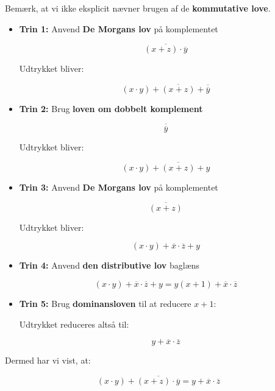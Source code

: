 \begin{solution}

    Bemærk, at vi ikke eksplicit nævner brugen af de \textbf{kommutative love}.

    \begin{itemize}

        \item \textbf{Trin 1:} Anvend \textbf{De Morgans lov} på komplementet
        
        \[ \overline{(x + z) \cdot \overline{y}} \]
        
        Udtrykket bliver:
        
        \[
        (x \cdot y) + \overline{(x + z)} + \overline{\overline{y}}
        \]
        
        \item \textbf{Trin 2:} Brug \textbf{loven om dobbelt komplement}
        
        \[
        \overline{\overline{y}}
        \]
        
        Udtrykket bliver:

         \[
        (x \cdot y) + \overline{(x + z)} + y
        \]
        
        \item \textbf{Trin 3:} Anvend \textbf{De Morgans lov} på komplementet
             
        \[
        \overline{(x + z)}
        \]
        
        Udtrykket bliver:

        \[
       (x \cdot y) + \overline{x} \cdot \overline{z} + y
       \]
        
        \item \textbf{Trin 4:} Anvend \textbf{den distributive lov} baglæns
        
        \[
        (x \cdot y) + \overline{x} \cdot \overline{z} + y = y (x + 1) + \overline{x} \cdot \overline{z}
        \]
        
        \item \textbf{Trin 5:} Brug \textbf{dominansloven} til at reducere \( x + 1 \):
        
        Udtrykket reduceres altså til:
        
        \[
        y + \overline{x} \cdot \overline{z}
        \]
        
    \end{itemize}
    
    Dermed har vi vist, at:
    
    \[
    (x \cdot y) + \overline{(x + z) \cdot \overline{y}} = y + \overline{x} \cdot \overline{z}
    \]
    

\end{solution}

